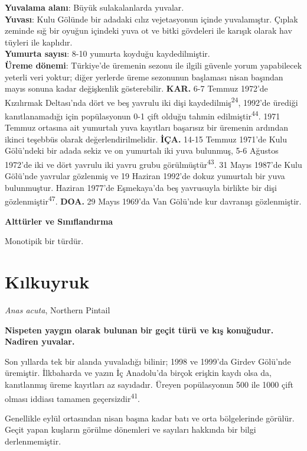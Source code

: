\documentclass[
  letterpaper,
  DIV=11,
  numbers=noendperiod]{scrreprt}
\begin{document}
\textbf{Yuvalama alanı}: Büyük sulakalanlarda yuvalar.\\
\textbf{Yuvası}: Kulu Gölünde bir adadaki cılız vejetasyonun içinde
yuvalamıştır. Çıplak zeminde sığ bir oyuğun içindeki yuva ot ve bitki
gövdeleri ile karışık olarak hav tüyleri ile kaplıdır.\\
\textbf{Yumurta sayısı}: 8-10 yumurta koyduğu kaydedilmiştir.\\
\textbf{Üreme dönemi}: Türkiye'de üremenin sezonu ile ilgili güvenle
yorum yapabilecek yeterli veri yoktur; diğer yerlerde üreme sezonunun
başlaması nisan başından mayıs sonuna kadar değişkenlik gösterebilir.
\textbf{KAR.} 6-7 Temmuz 1972'de Kızılırmak Deltası'nda dört ve beş
yavrulu iki dişi kaydedilmiş\textsuperscript{24}, 1992'de ürediği
kanıtlanamadığı için popülasyonun 0-1 çift olduğu tahmin
edilmiştir\textsuperscript{44}. 1971 Temmuz ortasına ait yumurtalı yuva
kayıtları başarısız bir üremenin ardından ikinci teşebbüs olarak
değerlendirilmelidir. \textbf{İÇA.} 14-15 Temmuz 1971'de Kulu Gölü'ndeki
bir adada sekiz ve on yumurtalı iki yuva bulunmuş, 5-6 Ağustos 1972'de
iki ve dört yavrulu iki yavru grubu görülmüştür\textsuperscript{43}. 31
Mayıs 1987'de Kulu Gölü'nde yavrular gözlenmiş ve 19 Haziran 1992'de
dokuz yumurtalı bir yuva bulunmuştur. Haziran 1977'de Eşmekaya'da beş
yavrusuyla birlikte bir dişi gözlenmiştir\textsuperscript{47}.
\textbf{DOA.} 29 Mayıs 1969'da Van Gölü'nde kur davranışı gözlenmiştir.

\textbf{Alttürler ve Sınıflandırma}

Monotipik bir türdür.

\hypertarget{kux131lkuyruk}{%
\section{Kılkuyruk}\label{kux131lkuyruk}}

\emph{Anas acuta}, Northern Pintail

\textbf{Nispeten yaygın olarak bulunan bir geçit türü ve kış konuğudur.
Nadiren yuvalar.}

Son yıllarda tek bir alanda yuvaladığı bilinir; 1998 ve 1999'da Girdev
Gölü'nde üremiştir. İlkbaharda ve yazın İç Anadolu'da birçok erişkin
kaydı olsa da, kanıtlanmış üreme kayıtları az sayıdadır. Üreyen
popülasyonun 500 ile 1000 çift olması iddiası tamamen
geçersizdir\textsuperscript{41}.

Genellikle eylül ortasından nisan başına kadar batı ve orta bölgelerinde
görülür. Geçit yapan kuşların görülme dönemleri ve sayıları hakkında bir
bilgi derlenmemiştir.
\end{document}
